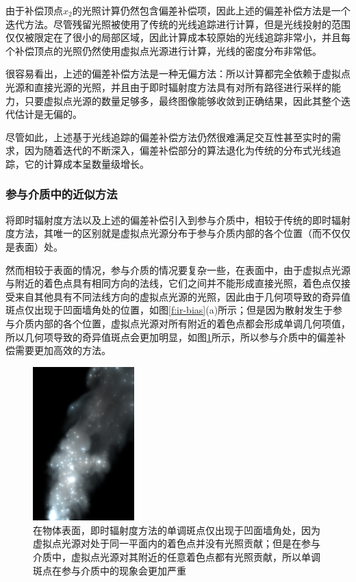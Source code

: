 由于补偿顶点$x_2$的光照计算仍然包含偏差补偿项，因此上述的偏差补偿方法是一个迭代方法。尽管残留光照被使用了传统的光线追踪进行计算，但是光线投射的范围仅仅被限定在了很小的局部区域，因此计算成本较原始的光线追踪非常小，并且每个补偿顶点的光照仍然使用虚拟点光源进行计算，光线的密度分布非常低。

很容易看出，上述的偏差补偿方法是一种无偏方法：所以计算都完全依赖于虚拟点光源和直接光源的光照，并且由于即时辐射度方法具有对所有路径进行采样的能力，只要虚拟点光源的数量足够多，最终图像能够收敛到正确结果，因此其整个迭代估计是无偏的。

尽管如此，上述基于光线追踪的偏差补偿方法仍然很难满足交互性甚至实时的需求，因为随着迭代的不断深入，偏差补偿部分的算法退化为传统的分布式光线追踪，它的计算成本呈数量级增长。



\subsubsection{参与介质中的近似方法}
\cite{a:UnbiasedGlobalIlluminationwithParticipatingMedia}将即时辐射度方法以及上述的偏差补偿引入到参与介质中，相较于传统的即时辐射度方法，其唯一的区别就是虚拟点光源分布于参与介质内部的各个位置（而不仅仅是表面）处。

然而相较于表面的情况，参与介质的情况要复杂一些，在表面中，由于虚拟点光源与附近的着色点具有相同方向的法线，它们之间并不能形成直接光照，着色点仅接受来自其他具有不同法线方向的虚拟点光源的光照，因此由于几何项导致的奇异值斑点仅出现于凹面墙角处的位置，如图\ref{f:ir-bias}(a)所示；但是因为散射发生于参与介质内部的各个位置，虚拟点光源对所有附近的着色点都会形成单调几何项值，所以几何项导致的奇异值斑点会更加明显，如图\ref{f:ir-unbounded-media}所示，所以参与介质中的偏差补偿需要更加高效的方法。

\begin{figure}
	\sidecaption
	\includegraphics[width=0.35\textwidth]{figures/ir/unbounded-media}
	\caption{在物体表面，即时辐射度方法的单调斑点仅出现于凹面墙角处，因为虚拟点光源对处于同一平面内的着色点并没有光照贡献；但是在参与介质中，虚拟点光源对其附近的任意着色点都有光照贡献，所以单调斑点在参与介质中的现象会更加严重}
	\label{f:ir-unbounded-media}
\end{figure}

